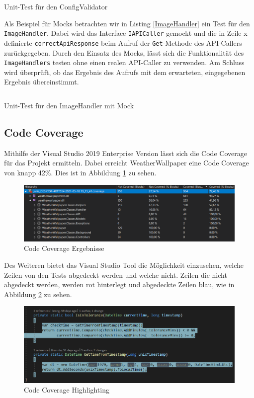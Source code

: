 \begin{listing}[h]
\inputminted[linenos=true,frame=lines]{csharp}{Listings/ConfigValidatorTest.cs}
\caption{Unit-Test für den ConfigValidator}
\label{ConfValidator}
\end{listing}

Als Beispiel für Mocks betrachten wir in Listing \ref{ImageHandler} ein Test für den \texttt{ImageHandler}. Dabei wird das Interface \texttt{IAPICaller} gemockt und die in Zeile x definierte \texttt{correctApiResponse} beim Aufruf der \texttt{Get}-Methode des API-Callers zurückgegeben. Durch den Einsatz des Mocks, lässt sich die Funktionalität des \texttt{ImageHandlers} testen ohne einen realen API-Caller zu verwenden. Am Schluss wird überprüft, ob das Ergebnis des Aufrufs mit dem erwarteten, eingegebenen Ergebnis übereinstimmt.

\begin{listing}[h]
\inputminted[linenos=true,frame=lines]{csharp}{Listings/ImageHandlerTest.cs}
\caption{Unit-Test für den ImageHandler mit Mock}
\label{ImageHandler}
\end{listing}

\subsection{Code Coverage}
Mithilfe der Visual Studio 2019 Enterprise Version lässt sich die Code Coverage für das Projekt ermitteln. Dabei erreicht WeatherWallpaper eine Code Coverage von knapp 42\%. Dies ist in Abbildung \ref{CodeCoverage} zu sehen. 
\begin{figure}[ht]
\centering
\includegraphics[width=\textwidth]{Bilder/CodeCoverage}
\caption[Code Coverage Ergebnisse]{\label{CodeCoverage} Code Coverage Ergebnisse}
\end{figure}
Des Weiteren bietet das Visual Studio Tool die Möglichkeit einzusehen, welche Zeilen von den Tests abgedeckt werden und welche nicht. Zeilen die nicht abgedeckt werden, werden rot hinterlegt und abgedeckte Zeilen blau, wie in Abbildung \ref{CodeCoverageHighlight} zu sehen.
\begin{figure}[ht]
\centering
\includegraphics[width=\textwidth]{Bilder/CodeCoverageHighlighted}
\caption[Code Coverage Ergebnisse]{\label{CodeCoverageHighlight} Code Coverage Highlighting}
\end{figure}